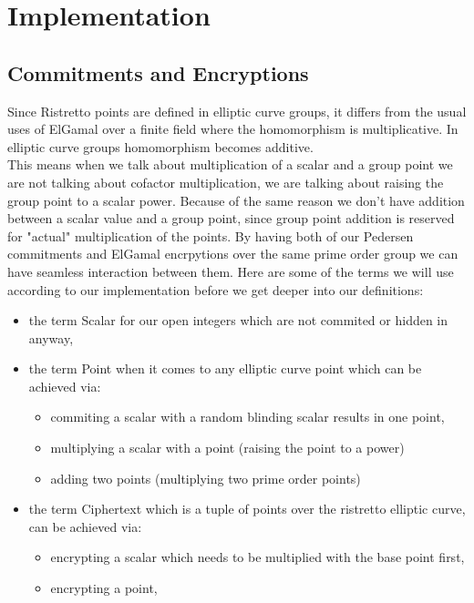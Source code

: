 \documentclass[12pt,a4paper]{report}
\begin{document}
\chapter{Implementation}
\section{Commitments and Encryptions}
Since Ristretto points are defined in elliptic curve groups, it differs from the usual uses of ElGamal over a finite field where the homomorphism is multiplicative. 
In elliptic curve groups homomorphism becomes additive\cite{decaf}. 
\\This means when we talk about multiplication of a scalar and a group point we are not talking about cofactor multiplication, 
we are talking about raising the group point to a scalar power. Because of the same reason we don't have addition between 
a scalar value and a group point, since group point addition is reserved for "actual" multiplication of the points.
By having both of our Pedersen commitments and ElGamal encrpytions over the same prime order group we can have seamless interaction between them. 
Here are some of the terms we will use according to our implementation before we get deeper into our definitions:
\begin{itemize}
	\item the term Scalar for our open integers which are not commited or hidden in anyway, 
	\item the term Point when it comes to any elliptic curve point which can be achieved via: 
		\begin{itemize}
			\item commiting a scalar with a random blinding scalar results in one point,
			\item multiplying a scalar with a point (raising the point to a power)
			\item adding two points (multiplying two prime order points)
		\end{itemize}
	\item the term Ciphertext which is a tuple of points over the ristretto elliptic curve, can be achieved via:
		\begin{itemize}
			\item encrypting a scalar which needs to be multiplied with the base point first,
			\item encrypting a point,
		\end{itemize}
\end{itemize}
\end{document}
